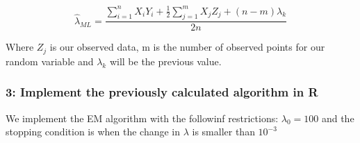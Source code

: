 \documentclass[
]{article}
\begin{document}
\[\hat\lambda_{ML} = \frac{ \sum_{i=1}^n X_i Y_i + \frac{1}{2} \sum_{j=1}^{m} X_j Z_j + (n-m) \lambda_k}{2n}\]

Where \(Z_j\) is our observed data, m is the number of observed points
for our random variable and \(\lambda_k\) will be the previous value.

\hypertarget{implement-the-previously-calculated-algorithm-in-r}{%
\subsubsection{3: Implement the previously calculated algorithm in
R}\label{implement-the-previously-calculated-algorithm-in-r}}

We implement the EM algorithm with the followinf restrictions:
\(\lambda_0 = 100\) and the stopping condition is when the change in
\(\lambda\) is smaller than \(10^{-3}\)
\end{document}
